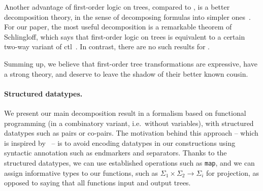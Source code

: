 Another advantage of first-order logic on trees, compared to \mso, is  a better decomposition theory, in the sense of decomposing formulas into  simpler ones~\cite{haferthomas,bojanczykDecidablePropertiesTree2004,esik-weil1}. 
For our paper, the most useful decomposition is a remarkable theorem of Schlingloff, which says that first-order logic on trees is equivalent to a certain two-way variant  of {\sc ctl}~\cite[Theorem 4.5]{schlingloff1992expressive}. In contrast, there are no such results for \mso. 



Summing up, we believe that first-order  tree transformations are  expressive, have a strong theory, and deserve to leave the shadow of their better known \mso cousin.


\paragraph*{Structured datatypes.} We present our main decomposition result in a formalism based on  functional programming (in a combinatory variant, i.e.~without variables), with structured datatypes such as pairs or co-pairs.  The motivation behind this approach  -- which is inspired by~\cite{bojanczykRegularFirstOrderList2018} -- is to avoid encoding datatypes in our constructions using syntactic annotation such as endmarkers and separators. Thanks to the  structured datatypes,  we can use established operations such as {\tt map}, and we can assign informative types to our functions, such as $\Sigma_1 \times \Sigma_2 \to \Sigma_i$ for projection, as opposed to saying that all functions input and output trees.  

